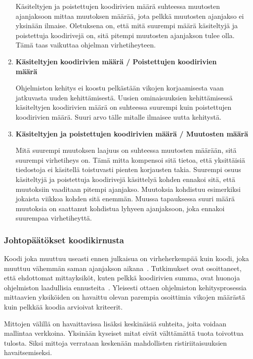 \documentclass[finnish]{../tktltiki2}
\theoremstyle{definition}
\theoremstyle{remark}
\begin{document}
\begin{enumerate}
    Käsiteltyjen ja poistettujen koodirivien määrä suhteessa muutosten ajanjaksoon mittaa muutoksen määrää, jota pelkkä 
    muutosten ajanjakso ei yksinään ilmaise. Oletuksena on, että mitä suurempi määrä käsiteltyjä ja poistettuja 
    koodirivejä on, sitä pitempi muutosten ajanjakson tulee olla. Tämä taas vaikuttaa ohjelman virhetiheyteen.

    \item {\bf Käsiteltyjen koodirivien määrä / Poistettujen koodirivien\\määrä}
    
    Ohjelmiston kehitys ei koostu pelkästään vikojen korjaamisesta vaan jatkuvasta uuden kehittämisestä. Uusien 
    ominaisuuksien kehittämisessä käsiteltyjen koodirivien määrä on suhteessa suurempi kuin poistettujen koodirivien 
    määrä. Suuri arvo tälle mitalle ilmaisee uutta kehitystä.

    \item {\bf Käsiteltyjen ja poistettujen koodirivien määrä / Muutosten määrä}
    
    Mitä suurempi muutoksen laajuus on suhteessa muutosten määrään, sitä suurempi virhetiheys on. Tämä mitta kompensoi 
    sitä tietoa, että yksittäisiä tiedostoja ei käsitellä toistuvasti pienten korjausten takia. Suurempi osuus 
    käsiteltyjä ja poistettuja koodirivejä käsittelyä kohden ennakoi sitä, että muutoksiin vaaditaan pitempi 
    ajanjakso. Muutoksia kohdistuu esimerkiksi jokaista viikkoa kohden sitä enemmän. Muussa tapauksessa suuri määrä 
    muutoksia on saattanut kohdistua lyhyeen ajanjaksoon, joka ennakoi suurempaa virhetiheyttä.

\end{enumerate}

\subsubsection{Johtopäätökset koodikirnusta}

Koodi joka muuttuu useasti ennen julkaisua on virheherkempää kuin koodi, joka muuttuu vähemmän saman ajanjakson 
aikana~\cite{NB05}. Tutkimukset ovat osoittaneet, että ehdottomat mittayksiköt, kuten pelkkä koodirivien summa, ovat 
huonoja ohjelmiston laadullisia ennusteita~\cite{NB05}. Yleisesti ottaen ohjelmiston kehitysprosessia mittaavien 
yksiköiden on havaittu olevan parempia osoittimia vikojen määrästä kuin pelkkää koodia arvioivat kriteerit.

    Mittojen välillä on havaittavissa lisäksi keskinäisiä suhteita, joita voidaan mallintaa verkkoina. Yksinään kyseiset 
mitat eivät välttämättä tuota toivottua tulosta. Siksi mittoja verrataan keskenään mahdollisten ristiriitaisuuksien 
havaitsemiseksi.\newline
\end{document}
